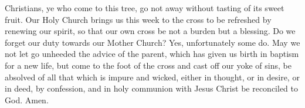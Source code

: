 Christians, ye who come to this tree, go not 
away without tasting of its sweet fruit. Our 
Holy Church brings us this week to the cross 
to be refreshed by renewing our spirit, so that 
our own cross be not a burden but a blessing. 
Do we forget our duty towards our Mother 
Church? Yes, unfortunately some do. May we 
not let go unheeded the advice of the parent, 
which has given us birth in baptism for a new 
life, but come to the foot of the cross and cast 
off our yoke of sins, be absolved of all that 
which is impure and wicked, either in thought, 
or in desire, or in deed, by confession, and in 
holy communion with Jesus Christ be reconciled
to God. Amen.
